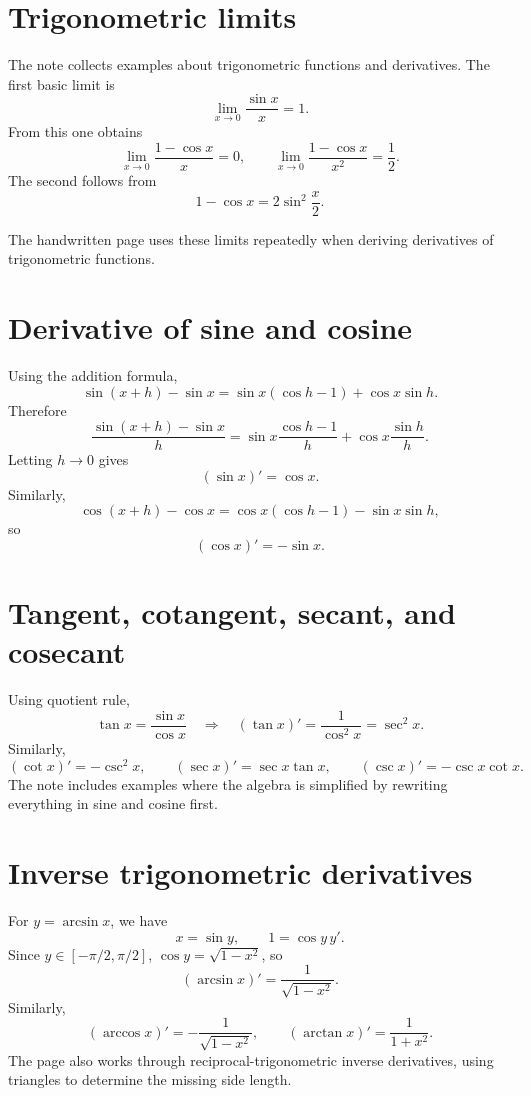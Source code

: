 
\section{Trigonometric limits}

The note collects examples about trigonometric functions and derivatives.  The first basic limit is
\[
  \lim_{x\to0}\frac{\sin x}{x}=1.
\]
From this one obtains
\[
  \lim_{x\to0}\frac{1-\cos x}{x}=0,\qquad
  \lim_{x\to0}\frac{1-\cos x}{x^2}=\frac12.
\]
The second follows from
\[
  1-\cos x=2\sin^2\frac x2.
\]

The handwritten page uses these limits repeatedly when deriving derivatives of trigonometric functions.

\section{Derivative of sine and cosine}

Using the addition formula,
\[
  \sin(x+h)-\sin x
  =\sin x(\cos h-1)+\cos x\sin h.
\]
Therefore
\[
  \frac{\sin(x+h)-\sin x}{h}
  =\sin x\frac{\cos h-1}{h}
  +\cos x\frac{\sin h}{h}.
\]
Letting $h\to0$ gives
\[
  (\sin x)'=\cos x.
\]
Similarly,
\[
  \cos(x+h)-\cos x
  =\cos x(\cos h-1)-\sin x\sin h,
\]
so
\[
  (\cos x)'=-\sin x.
\]

\section{Tangent, cotangent, secant, and cosecant}

Using quotient rule,
\[
  \tan x=\frac{\sin x}{\cos x}
  \quad\Longrightarrow\quad
  (\tan x)'=\frac{1}{\cos^2x}=\sec^2x.
\]
Similarly,
\[
  (\cot x)'=-\csc^2x,\qquad
  (\sec x)'=\sec x\tan x,\qquad
  (\csc x)'=-\csc x\cot x.
\]
The note includes examples where the algebra is simplified by rewriting everything in sine and cosine first.

\section{Inverse trigonometric derivatives}

For $y=\arcsin x$, we have
\[
  x=\sin y,\qquad
  1=\cos y\,y'.
\]
Since $y\in[-\pi/2,\pi/2]$, $\cos y=\sqrt{1-x^2}$, so
\[
  (\arcsin x)'=\frac1{\sqrt{1-x^2}}.
\]
Similarly,
\[
  (\arccos x)'=-\frac1{\sqrt{1-x^2}},\qquad
  (\arctan x)'=\frac1{1+x^2}.
\]
The page also works through reciprocal-trigonometric inverse derivatives, using triangles to determine the missing side length.

